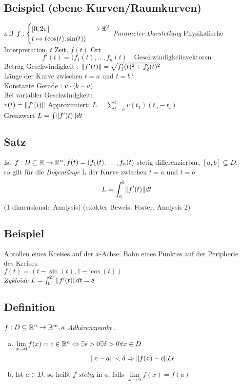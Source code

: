 \subsection{Beispiel (ebene Kurven/Raumkurven)}
z.B $f : \begin{cases}
[0,2\pi] &\to \mathbb{R}^2\\
t \mapsto (\cos(t),\sin(t))
\end{cases}$ \emph{Parameter-Darstellung}
Physikalische Interpretation, $t$ Zeit, $f(t)$ Ort\\
\[f'(t) = (f_1(t),\ldots, f_n(t)\quad \text{Geschwindigkeitsvektoren}  \]
Betrag Geschwindigkeit : $\Vert f'(t)\Vert = \sqrt{f_1'(t)^2 + f_2'(t)^2}$\\
Länge der Kurve zwischen $t = a$ und $t = b$?\\
Konstante Gerade : $v \cdot (b-a)$\\
Bei variabler Geschwindgkeit:\\
$v(t) = \Vert f'(t)\Vert$ Approximiert: $L = \sum\limits^{b}_{i=a} v(t_1) (t_a - t_i)$\\
Grenzwert $L = \int\norm{f'(t)}dt$
\subsection{Satz}
Ist $f : D \subseteq \mathbb{R} \to \mathbb{R}^n, f(t) = (f_1(t),\ldots, f_n(t)$ stetig differenzierbar, $[a,b] \subseteq D$.\\
so gilt für die \emph{Bogenlänge} L der Kurve zwischen $t =a$ und $t=b$\\
\[L = \int_a^b \norm{f'(t)}dt   \]
(1 dimensionale Analysis) \hfill (exakter Beweis: Foster, Analysis 2)
\subsection{Beispiel}
Abrollen eines Kreises auf  der $x$-Achse. Bahn eines Punktes auf der Peripherie des Kreises.\\
$f(t) = (t-\sin(t),1-\cos(t) )$\\
{\em Zykloide} $L = \int^{2\pi}_0\norm{f'(t)} dt = 8$
\subsection{Definition}
$f : D \subseteq \mathbb{R}^n \to \mathbb{R}^m, a$ \emph{Adhärenzpunkt} .
\begin{enumerate}[a)]
\item $\lim\limits_{x \to 0}f(x) = c \in \mathbb{R}^n \Leftrightarrow \exists \epsilon > 0 \exists \delta > 0 \forall x \in D$
\[ \Vert x-a\Vert < \delta \Rightarrow \Vert f(x) - c\Vert L \epsilon \]
\item Ist $a \in D$, so hei\ss t $f$ \emph{stetig} in $a$, falls $\lim\limits_{x \to 0} f(x) = f(a)$
\end{enumerate}

